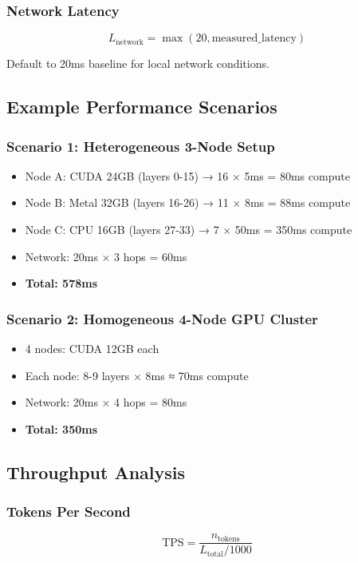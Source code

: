 \documentclass[12pt,a4paper]{article}
\begin{document}
\subsubsection{Network Latency}

\begin{equation}
L_{\text{network}} = \max(20, \text{measured\_latency})
\end{equation}

Default to 20ms baseline for local network conditions.

\subsection{Example Performance Scenarios}

\subsubsection{Scenario 1: Heterogeneous 3-Node Setup}
\begin{itemize}
    \item Node A: CUDA 24GB (layers 0-15) → 16 × 5ms = 80ms compute
    \item Node B: Metal 32GB (layers 16-26) → 11 × 8ms = 88ms compute
    \item Node C: CPU 16GB (layers 27-33) → 7 × 50ms = 350ms compute
    \item Network: 20ms × 3 hops = 60ms
    \item \textbf{Total: 578ms}
\end{itemize}

\subsubsection{Scenario 2: Homogeneous 4-Node GPU Cluster}
\begin{itemize}
    \item 4 nodes: CUDA 12GB each
    \item Each node: 8-9 layers × 8ms ≈ 70ms compute
    \item Network: 20ms × 4 hops = 80ms
    \item \textbf{Total: 350ms}
\end{itemize}

\subsection{Throughput Analysis}

\subsubsection{Tokens Per Second}
\begin{equation}
\text{TPS} = \frac{n_{\text{tokens}}}{L_{\text{total}} / 1000}
\end{equation}
\end{document}
